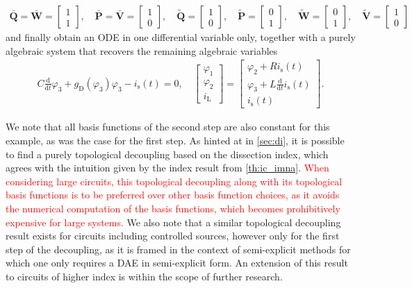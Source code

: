 \documentclass[AMA,STIX1COL]{WileyNJD-v2}
\newcommand{\mbt}[1]{\tilde{\mathbf{#1}}}
\newcommand{\mbb}[1]{\bar{\mathbf{#1}}}
\newcommand{\mr}[1]{\mathrm{#1}}
\newcommand{\ddt}{\frac{\mathrm{d}}{\mathrm{d}t}}
\begin{document}
\begin{align*}
    \mbb{Q} = \mbb{W} = \begin{bmatrix}
        1\\
        1
    \end{bmatrix}, \quad \mbb{P} = \mbb{V} = \begin{bmatrix}
        1\\
        0
    \end{bmatrix}, \quad \mbt{Q} = \begin{bmatrix}
        1\\
        0
    \end{bmatrix}, \quad \mbt{P} = \begin{bmatrix}
        0\\
        1
    \end{bmatrix}, \quad \mbt{W} = \begin{bmatrix}
        0\\
        1
    \end{bmatrix}, \quad \mbt{V} = \begin{bmatrix}
        1\\
        0
    \end{bmatrix}
\end{align*}
and finally obtain an ODE in one differential variable only, together with a purely algebraic system that recovers the remaining algebraic variables
\begin{align}
    C \ddt \varphi_3 + g_\mr{D}(\varphi_3) \varphi_3 - i_\mr{s}(t) = 0, \quad \begin{bmatrix}
        \varphi_1\\
        \varphi_2\\
        i_\mr{L}
    \end{bmatrix} = \begin{bmatrix}
        \varphi_2 + R i_\mr{s}(t)\\
        \varphi_3 + L \ddt i_\mr{s}(t)\\
        i_\mr{s}(t)
    \end{bmatrix} \label{eq:itc_do2}.
\end{align}

We note that all basis functions of the second step are also constant for this example, as was the case for the first step. As hinted at in \autoref{sec:di}, it is possible to find a purely topological decoupling based on the dissection index\cite{jansen2014}, which agrees with the intuition given by the index result from \autoref{th:ic_imna}. \textcolor{red}{When considering large circuits, this topological decoupling along with its topological basis functions is to be preferred over other basis function choices, as it avoids the numerical computation of the basis functions, which becomes prohibitively expensive for large systems.} We also note that a similar topological decoupling result exists for circuits including controlled sources, however only for the first step of the decoupling, as it is framed in the context of semi-explicit methods for which one only requires a DAE in semi-explicit form\cite{jansen2014}. An extension of this result to circuits of higher index is within the scope of further research.
\end{document}

